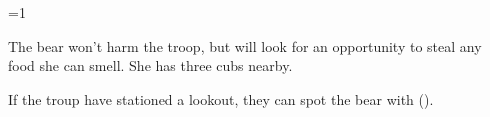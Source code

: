 
\ifnum\value{cycle}=1

\bear
{}

The bear won't harm the troop, but will look for an opportunity to steal any food she can smell.
She has three cubs nearby.

\setcounter{tn}{\value{Dexterity}}
\addtocounter{tn}{\value{Stealth}}

If the troup have stationed a lookout, they can spot the bear with  (\tn).

\fi
